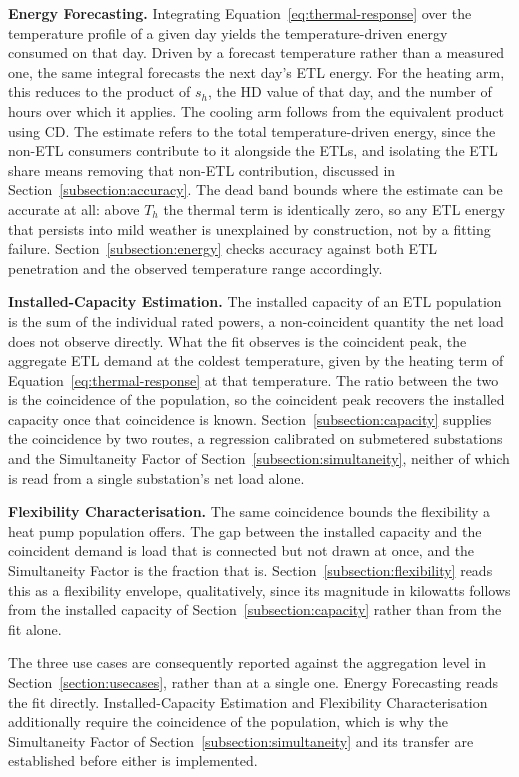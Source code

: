 \documentclass[9pt,journal,a4]{IEEEtran}
\begin{document}
\textbf{Energy Forecasting.} Integrating Equation~\eqref{eq:thermal-response} over the temperature profile of a given day yields the temperature-driven energy consumed on that day. Driven by a forecast temperature rather than a measured one, the same integral forecasts the next day's ETL energy. For the heating arm, this reduces to the product of $s_h$, the HD value of that day, and the number of hours over which it applies. The cooling arm follows from the equivalent product using CD. The estimate refers to the total temperature-driven energy, since the non-ETL consumers contribute to it alongside the ETLs, and isolating the ETL share means removing that non-ETL contribution, discussed in Section~\ref{subsection:accuracy}. The dead band bounds where the estimate can be accurate at all: above $T_h$ the thermal term is identically zero, so any ETL energy that persists into mild weather is unexplained by construction, not by a fitting failure. Section~\ref{subsection:energy} checks accuracy against both ETL penetration and the observed temperature range accordingly.

\textbf{Installed-Capacity Estimation.} The installed capacity of an ETL population is the sum of the individual rated powers, a non-coincident quantity the net load does not observe directly. What the fit observes is the coincident peak, the aggregate ETL demand at the coldest temperature, given by the heating term of Equation~\eqref{eq:thermal-response} at that temperature. The ratio between the two is the coincidence of the population, so the coincident peak recovers the installed capacity once that coincidence is known. Section~\ref{subsection:capacity} supplies the coincidence by two routes, a regression calibrated on submetered substations and the Simultaneity Factor of Section~\ref{subsection:simultaneity}, neither of which is read from a single substation's net load alone.

\textbf{Flexibility Characterisation.} The same coincidence bounds the flexibility a heat pump population offers. The gap between the installed capacity and the coincident demand is load that is connected but not drawn at once, and the Simultaneity Factor is the fraction that is. Section~\ref{subsection:flexibility} reads this as a flexibility envelope, qualitatively, since its magnitude in kilowatts follows from the installed capacity of Section~\ref{subsection:capacity} rather than from the fit alone.

The three use cases are consequently reported against the aggregation level in Section~\ref{section:usecases}, rather than at a single one. Energy Forecasting reads the fit directly. Installed-Capacity Estimation and Flexibility Characterisation additionally require the coincidence of the population, which is why the Simultaneity Factor of Section~\ref{subsection:simultaneity} and its transfer are established before either is implemented.
\end{document}
